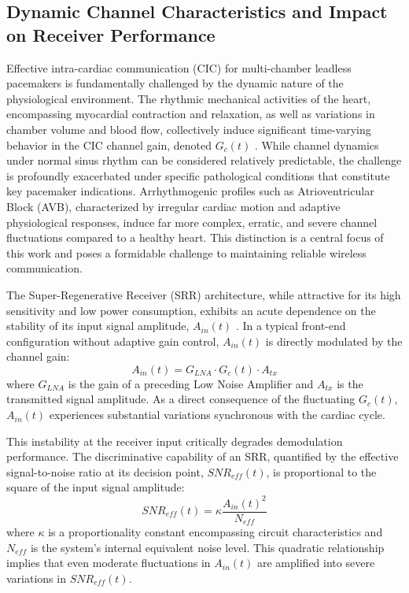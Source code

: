 \documentclass[journal]{IEEEtran}
\begin{document}
\subsection{Dynamic Channel Characteristics and Impact on Receiver Performance}
\label{subsec:channel_and_impact}
Effective intra-cardiac communication (CIC) for multi-chamber leadless pacemakers is fundamentally challenged by the dynamic nature of the physiological environment. The rhythmic mechanical activities of the heart, encompassing myocardial contraction and relaxation, as well as variations in chamber volume and blood flow, collectively induce significant time-varying behavior in the CIC channel gain, denoted $G_c(t)$ \cite{your_ref_to_channel_dynamics}. While channel dynamics under normal sinus rhythm can be considered relatively predictable, the challenge is profoundly exacerbated under specific pathological conditions that constitute key pacemaker indications.  Arrhythmogenic profiles such as Atrioventricular Block (AVB), characterized by irregular cardiac motion and adaptive physiological responses, induce far more complex, erratic, and severe channel fluctuations compared to a healthy heart. This distinction is a central focus of this work and poses a formidable challenge to maintaining reliable wireless communication.

The Super-Regenerative Receiver (SRR) architecture, while attractive for its high sensitivity and low power consumption, exhibits an acute dependence on the stability of its input signal amplitude, $A_{in}(t)$ \cite{your_ref_to_srr_sensitivity}. In a typical front-end configuration without adaptive gain control, $A_{in}(t)$ is directly modulated by the channel gain:
\begin{equation}
    A_{in}(t) = G_{LNA} \cdot G_c(t) \cdot A_{tx}
    \label{eq:Ain_t_revised}
\end{equation}
where $G_{LNA}$ is the gain of a preceding Low Noise Amplifier and $A_{tx}$ is the transmitted signal amplitude. As a direct consequence of the fluctuating $G_c(t)$, $A_{in}(t)$ experiences substantial variations synchronous with the cardiac cycle.

This instability at the receiver input critically degrades demodulation performance. The discriminative capability of an SRR, quantified by the effective signal-to-noise ratio at its decision point, $SNR_{eff}(t)$, is proportional to the square of the input signal amplitude:
\begin{equation}
    SNR_{eff}(t) = \kappa \frac{A_{in}(t)^2}{N_{eff}}
    \label{eq:snr_eff_revised}
\end{equation}
where $\kappa$ is a proportionality constant encompassing circuit characteristics and $N_{eff}$ is the system's internal equivalent noise level. This quadratic relationship implies that even moderate fluctuations in $A_{in}(t)$ are amplified into severe variations in $SNR_{eff}(t)$.
\end{document}
